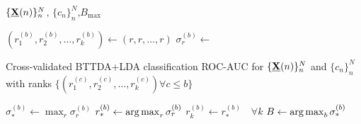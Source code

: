 \begin{algorithmic}[1]
  \Require $\{\underline{\mathbf{X}}(n)\}_n^N$, $\{c_n\}_n^N$,$B_\text{max}$

  \State $\textstyle{(r_1^{(b)},r_2^{(b)},\ldots,r_k^{(b)}) \gets (r,r,\ldots,r)}$
  \State $\sigma^{(b)}_r \gets$ \parbox[t]{5cm}{Cross-validated BTTDA+LDA classification
  ROC-AUC for $\{\underline{\mathbf{X}}(n)\}_n^N$ and $\{c_n\}_n^N$ with ranks  $\{(r_1^{(c)},r_2^{(c)},\ldots,r_k^{(c)}) \forall
c\leq b\}$}
  \EndFor
  \State $\textstyle{\sigma^{(b)}_* \gets \max_r\sigma^{(b)}_r}$
  \State $\textstyle{r^{(b)}_* \gets \operatorname*{arg\,max}_r\sigma^{(b)}_r}$
  \State $r_k^{(b)}\gets r^{(b)}_*\quad\forall k$
  \EndFor
  \State $\textstyle{B\gets\operatorname*{arg\,max}_b\sigma^{(b)}_*}$
\end{algorithmic}
